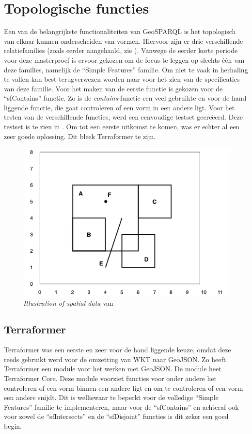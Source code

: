 \section{Topologische functies}
\label{sec:topologische_functies}
Een van de belangrijkste functionaliteiten van GeoSPARQL is het topologisch van elkaar kunnen onderscheiden van vormen. Hiervoor zijn er drie verschillende relatiefamilies (zoals eerder aangehaald, zie ). Vanwege de eerder korte periode voor deze masterproef is ervoor gekozen om de focus te leggen op slechts één van deze families, namelijk de ``Simple Features'' familie. Om niet te vaak in herhaling te vallen kan best terugverwezen worden naar  voor het zien van de specificaties van deze familie. Voor het maken van de eerste functie is gekozen voor de ``sfContains'' functie. Zo is de \textit{contains}-functie een veel gebruikte en voor de hand liggende functie, die gaat controleren of een vorm in een andere ligt. Voor het testen van de verschillende functies, werd een eenvoudige testset gecreëerd. Deze testset is te zien in . Om tot een eerste uitkomst te komen, was er echter al een zeer goede oplossing. Dit bleek Terraformer te zijn.

\begin{figure}
    \centering
    \includegraphics[width=0.5\linewidth]{images/geosparql_example.png}
    \caption{\textit{Illustration of spatial data} van \cite{ogcdocs}}
    \label{fig:illustration_spatial_data}
\end{figure}

\subsection{Terraformer}
Terraformer was een eerste en zeer voor de hand liggende keuze, omdat deze reeds gebruikt werd voor de omzetting van WKT naar GeoJSON. Zo heeft Terraformer een module voor het werken met GeoJSON. De module heet Terraformer Core. Deze module voorziet functies voor onder andere het controleren of een vorm binnen een andere ligt en om te controleren of een vorm een andere snijdt. Dit is welliswaar te beperkt voor de volledige ``Simple Features'' familie te implementeren, maar voor de ``sfContains'' en achteraf ook voor zowel de ``sfIntersects'' en de ``sfDisjoint'' functies is dit zeker een goed begin. 

